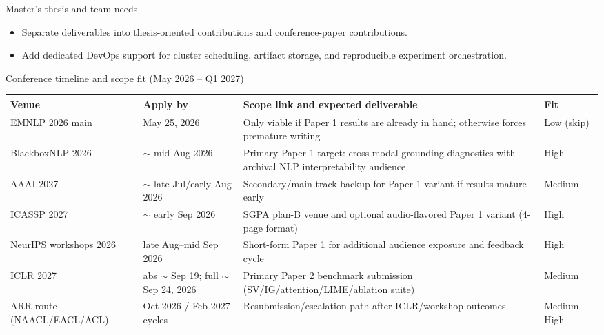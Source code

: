 \documentclass[aspectratio=169]{beamer}
\begin{document}
\begin{frame}{Master's thesis and team needs}
  \begin{itemize}
    \item Separate deliverables into thesis-oriented contributions and conference-paper contributions.
    \item Add dedicated DevOps support for cluster scheduling, artifact storage, and reproducible experiment orchestration.
  \end{itemize}
\end{frame}

\begin{frame}{Conference timeline and scope fit (May 2026 -- Q1 2027)}
  \scriptsize
  \begin{tabularx}{\textwidth}{>{\raggedright\arraybackslash}p{2.7cm} >{\raggedright\arraybackslash}p{1.9cm} >{\raggedright\arraybackslash}X >{\raggedright\arraybackslash}p{1.2cm}}
    \toprule
    \textbf{Venue} & \textbf{Apply by} & \textbf{Scope link and expected deliverable} & \textbf{Fit} \\
    \midrule
    EMNLP 2026 main & May 25, 2026 & Only viable if Paper 1 results are already in hand; otherwise forces premature writing & Low (skip) \\
    BlackboxNLP 2026 & \(\sim\) mid-Aug 2026 & Primary Paper 1 target: cross-modal grounding diagnostics with archival NLP interpretability audience & High \\
    AAAI 2027 & \(\sim\) late Jul/early Aug 2026 & Secondary/main-track backup for Paper 1 variant if results mature early & Medium \\
    ICASSP 2027 & \(\sim\) early Sep 2026 & SGPA plan-B venue and optional audio-flavored Paper 1 variant (4-page format) & High \\
    NeurIPS workshops 2026 & late Aug--mid Sep 2026 & Short-form Paper 1 for additional audience exposure and feedback cycle & High \\
    ICLR 2027 & abs \(\sim\) Sep 19; full \(\sim\) Sep 24, 2026 & Primary Paper 2 benchmark submission (SV/IG/attention/LIME/ablation suite) & Medium \\
    ARR route (NAACL/EACL/ACL) & Oct 2026 / Feb 2027 cycles & Resubmission/escalation path after ICLR/workshop outcomes & Medium--High \\
    \bottomrule
  \end{tabularx}
\end{frame}
\end{document}

